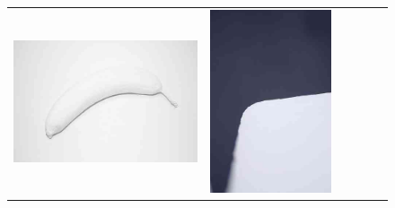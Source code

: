 \begin{figure}
\begin{tabular}{m{.01\linewidth} m{.16\linewidth} m{.16\linewidth} m{.16\linewidth} m{.16\linewidth} m{.16\linewidth}}
    \includegraphics[width=\linewidth]{../style/figures/flickr_on_flickr/pred_style_Minimal/3.jpg} &
    \includegraphics[width=\linewidth]{../style/figures/flickr_on_flickr/pred_style_Minimal/4.jpg} \\

\end{tabular}
\end{figure}
